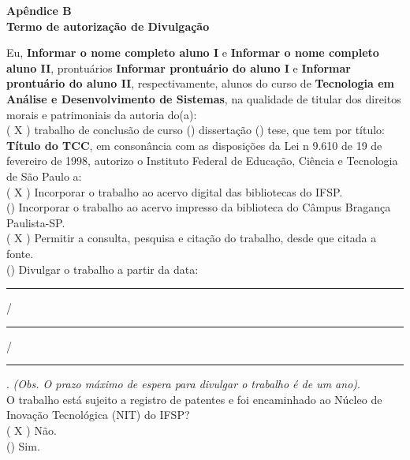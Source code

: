 \documentclass[12pt,a4paper]{report}
\newcommand{\curso}{Tecnologia em Análise e Desenvolvimento de Sistemas}
\newcommand{\cabecalho}{Apêndice B \\ Termo de autorização de Divulgação}
\newcommand{\tema}{Título do TCC}
\newcommand{\alunoA}{Informar o nome completo aluno I}
\newcommand{\prontuarioA}{Informar prontuário do aluno I}
\newcommand{\alunoB}{Informar o nome completo aluno II}
\newcommand{\prontuarioB}{Informar prontuário do aluno II}
\begin{document}
	\begin{center}
		{\small\textbf{\cabecalho}}\\
		\vspace{0.5cm}
	\end{center}
	
	\noindent Eu, \textbf{\alunoA} e \textbf{\alunoB}, prontuários \textbf{\prontuarioA} e \textbf{\prontuarioB}, respectivamente, alunos do curso de \textbf{\curso}, na qualidade de titular dos direitos morais e patrimoniais da autoria do(a): \vspace{6pt}\\
	( X ) trabalho de conclusão de curso \hspace{0.5cm}   (\hspace{0.5cm}) \hspace{0.5cm} dissertação (\hspace{0.5cm}) tese, que tem por título: \textbf{\tema}, em consonância com as disposições da Lei n\textdegree \hspace{0.01cm} 9.610 de 19 de fevereiro de 1998, autorizo o Instituto Federal de Educação, Ciência e Tecnologia de São Paulo a: \vspace{6pt}\\
	( X ) Incorporar o trabalho ao acervo digital das bibliotecas do IFSP. \vspace{4pt}\\
    (\hspace{0.5cm}) Incorporar o trabalho ao acervo impresso da biblioteca do Câmpus Bragança Paulista-SP.\vspace{4pt} \\
    ( X ) Permitir a consulta, pesquisa e citação do trabalho, desde que citada a fonte.\vspace{4pt} \\
    (\hspace{0.5cm}) Divulgar o trabalho a partir da data:  \hspace{0.01cm}\rule{1cm}{0.1pt} \hspace{0.01cm} / \rule{1cm}{0.1pt}\hspace{0.01cm} / \hspace{0.01cm}\rule{1cm}{0.1pt}.
    \textit{(Obs. O prazo máximo de espera para divulgar o trabalho é de um ano)}.  \\
    

    \noindent O trabalho está sujeito a registro de patentes e foi encaminhado ao Núcleo de Inovação Tecnológica (NIT) do IFSP?\vspace{6pt} \\
    ( X ) Não.\vspace{6pt} \\
    (\hspace{0.5cm}) Sim. \vspace{6pt}\\
\end{document}
